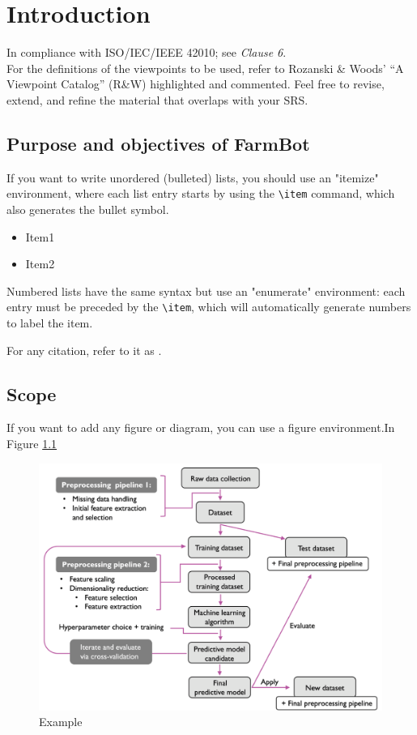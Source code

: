 
\chapter{Introduction} \label{introduction}

In compliance with ISO/IEC/IEEE 42010; see \textit{Clause 6}.\\
For the definitions of the viewpoints to be used, refer to Rozanski \& Woods’ “A Viewpoint Catalog” (R\&W) highlighted and commented.
Feel free to revise, extend, and refine the material that overlaps with your SRS.


\section{Purpose and objectives of FarmBot}

If you want to write unordered (bulleted) lists, you should use an "itemize" environment, where each list entry starts by using the \verb|\item| command, which also generates the bullet symbol.

\begin{itemize}
    \item Item1  
    \item Item2 
\end{itemize}

Numbered lists have the same syntax but use an "enumerate" environment: each entry must be preceded by the \verb|\item|, which will automatically generate numbers to label the item. 

For any citation, refer to it as \cite{younis2021hybrid}.

\section{Scope}

If you want to add any figure or diagram, you can use a figure environment.In Figure \ref{Fig:Example}

\begin{figure}[ht]
\centering
\includegraphics[width=.9 \textwidth]{Figures/ExampleFigure.png}
\caption{Example \label{Fig:Example}}
\end{figure}

